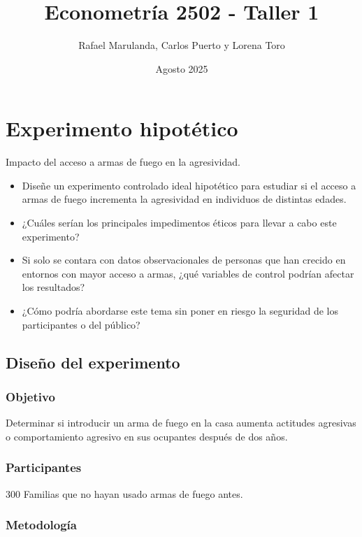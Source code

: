 \documentclass[12pt]{article}
\title{Econometría 2502 - Taller 1}
\author{Rafael Marulanda, Carlos Puerto y Lorena Toro}
\date{Agosto 2025}
\begin{document}
\maketitle

\section{Experimento hipotético}

Impacto del acceso a armas de fuego en la agresividad.

\begin{itemize}
    \item Diseñe un experimento controlado ideal hipotético para estudiar si el acceso a armas de fuego incrementa la agresividad en individuos de distintas edades.

    \item ¿Cuáles serían los principales impedimentos éticos para llevar a cabo este experimento?

    \item Si solo se contara con datos observacionales de personas que han crecido en entornos con mayor acceso a armas, ¿qué variables de control podrían afectar los resultados?

    \item ¿Cómo podría abordarse este tema sin poner en riesgo la seguridad de los participantes o del público?
\end{itemize}

\subsection{Diseño del experimento}

\subsubsection{Objetivo} 

Determinar si introducir un arma de fuego en la casa aumenta actitudes agresivas o comportamiento agresivo en sus ocupantes después de dos años. 

\subsubsection{Participantes} 300 Familias que no hayan usado armas de fuego antes. 

\subsubsection{Metodología} 
\end{document}
